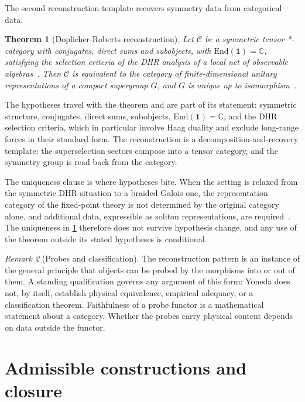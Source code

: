 \documentclass[11pt,letterpaper]{article}
\newtheorem{theorem}{Theorem}[section]
\theoremstyle{definition}
\theoremstyle{remark}
\newtheorem{remark}[theorem]{Remark}
\begin{document}
The second reconstruction template recovers symmetry data from categorical data.

\begin{theorem}[Doplicher-Roberts reconstruction]
\label{thm:dr-reconstruction}
Let $\mathcal{C}$ be a symmetric tensor *-category with conjugates, direct sums and subobjects, with $\mathrm{End}(\mathbf{1}) = \mathbb{C}$, satisfying the selection criteria of the DHR analysis of a local net of observable algebras~\cite{dhr}. Then $\mathcal{C}$ is equivalent to the category of finite-dimensional unitary representations of a compact supergroup $G$, and $G$ is unique up to isomorphism~\cite{dr-duality,dr-endomorphisms}.
\end{theorem}

The hypotheses travel with the theorem and are part of its statement: symmetric structure, conjugates, direct sums, subobjects, $\mathrm{End}(\mathbf{1}) = \mathbb{C}$, and the DHR selection criteria, which in particular involve Haag duality and exclude long-range forces in their standard form. The reconstruction is a decomposition-and-recovery template: the superselection sectors compose into a tensor category, and the symmetry group is read back from the category.

The uniqueness clause is where hypotheses bite. When the setting is relaxed from the symmetric DHR situation to a braided Galois one, the representation category of the fixed-point theory is not determined by the original category alone, and additional data, expressible as soliton representations, are required~\cite{muger}. The uniqueness in \cref{thm:dr-reconstruction} therefore does not survive hypothesis change, and any use of the theorem outside its stated hypotheses is conditional.

\begin{remark}[Probes and classification]
\label{rem:yoneda}
The reconstruction pattern is an instance of the general principle that objects can be probed by the morphisms into or out of them. A standing qualification governs any argument of this form: Yoneda does not, by itself, establish physical equivalence, empirical adequacy, or a classification theorem. Faithfulness of a probe functor is a mathematical statement about a category. Whether the probes carry physical content depends on data outside the functor.
\end{remark}

\section{Admissible constructions and closure}
\end{document}
